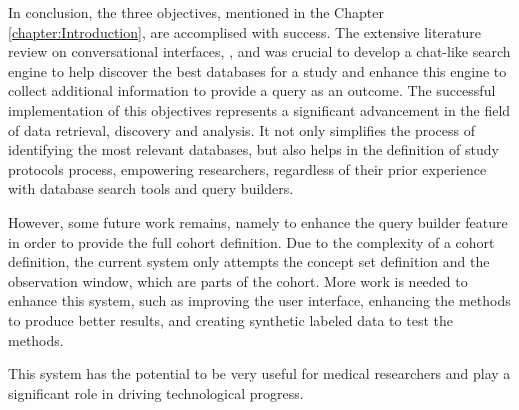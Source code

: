 In conclusion, the three objectives, mentioned in the Chapter \ref{chapter:Introduction}, are accomplised with success. The extensive literature review on conversational interfaces, {\nlp}, and {\ir} was crucial to develop a chat-like search engine to help discover the best databases for a study and enhance this engine to collect additional information to provide a query as an outcome. The successful implementation of this objectives represents a significant advancement in the field of data retrieval, discovery and analysis. It not only simplifies the process of identifying the most relevant databases, but also helps in the definition of study protocols process, empowering researchers, regardless of their prior experience with database search tools and query builders.

However, some future work remains, namely to enhance the query builder feature in order to provide the full cohort definition. Due to the complexity of a cohort definition, the current system only attempts the concept set definition and the observation window, which are parts of the cohort. More work is needed to enhance this system, such as improving the user interface, enhancing the {\ir} methods to produce better results, and creating synthetic labeled data to test the {\ir} methods.

This system has the potential to be very useful for medical researchers and play a significant role in driving technological progress.
 

